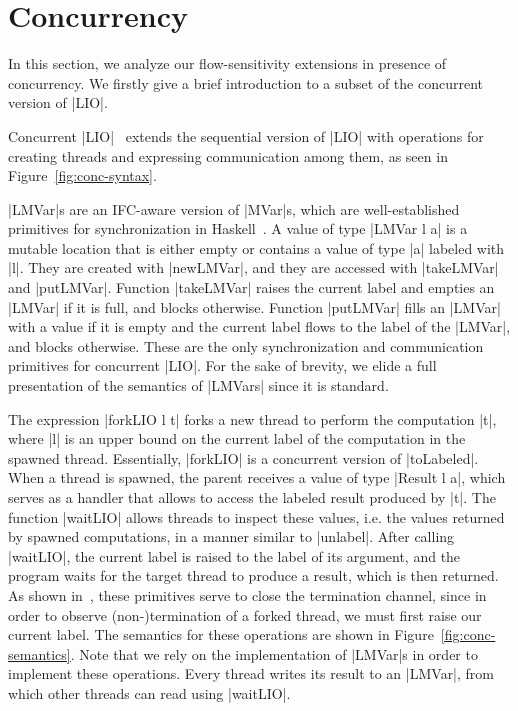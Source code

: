 \section{Concurrency}
\label{sec:conc}

In this section, we analyze our flow-sensitivity extensions in presence of
concurrency. We firstly give a brief introduction to a subset of the concurrent
version of |LIO|.

Concurrent |LIO|~\cite{?} extends the sequential version of |LIO| with
operations for creating threads and expressing communication among
them, as seen in Figure~\ref{fig:conc-syntax}.

|LMVar|s are an IFC-aware version of |MVar|s, which are
well-established primitives for synchronization in
Haskell~\cite{CH96}.  A value of type |LMVar l a| is a mutable
location that is either empty or contains a value of type |a| labeled
with |l|. They are created with |newLMVar|, and they are accessed with
|takeLMVar| and |putLMVar|. Function |takeLMVar| raises the current
label and empties an |LMVar| if it is full, and blocks
otherwise. Function |putLMVar| fills an |LMVar| with a value if it is
empty and the current label flows to the label of the |LMVar|, and
blocks otherwise. These are the only synchronization and communication
primitives for concurrent |LIO|. For the sake of brevity, we elide a
full presentation of the semantics of |LMVars| since it is standard.

The expression |forkLIO l t| forks a new thread to perform the
computation |t|, where |l| is an upper bound on the current label of
the computation in the spawned thread. Essentially, |forkLIO| is a
concurrent version of |toLabeled|. When a thread is spawned, the
parent receives a value of type |Result l a|, which serves as a
handler that allows to access the labeled result produced by |t|. The
function |waitLIO| allows threads to inspect these values, i.e. the
values returned by spawned computations, in a manner similar to
|unlabel|. After calling |waitLIO|, the current label is raised to the
label of its argument, and the program waits for the target thread to
produce a result, which is then returned. As shown in~\cite{?}, these
primitives serve to close the termination channel, since in order to
observe (non-)termination of a forked thread, we must first raise our
current label. The semantics for these operations are shown in
Figure~\ref{fig:conc-semantics}. Note that we rely on the
implementation of |LMVar|s in order to implement these
operations. Every thread writes its result to an |LMVar|, from which
other threads can read using |waitLIO|.

